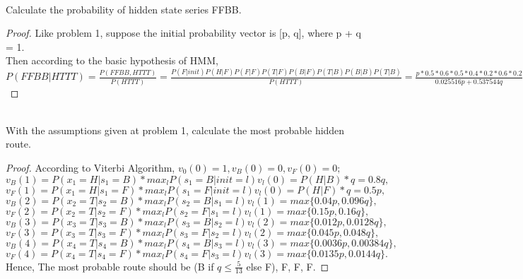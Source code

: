 \documentclass{article}
\newenvironment{problem}[2][Problem]{\begin{trivlist}
\item[\hskip \labelsep {\bfseries #1}\hskip \labelsep {\bfseries #2.}]}{\end{trivlist}}
\begin{document}
\begin{problem}{3}
\text{ } \\
Calculate the probability of hidden state series FFBB.
\end{problem}
\begin{proof}
Like problem 1, suppose the initial probability vector is [p, q], where p + q = 1. \\
Then according to the basic hypothesis of HMM, \\
$P(FFBB|HTTT) = \frac{P(FFBB,HTTT)}{P(HTTT)} = \frac{P(F|init)P(H|F)P(F|F)P(T|F)P(B|F)P(T|B)P(B|B)P(T|B)}{P(HTTT)} = \frac{p*0.5*0.6*0.5*0.4*0.2*0.6*0.2}{0.025516p + 0.537544q} = \frac{0.00144p}{0.025516p+0.537544q}.$
\end{proof}

\begin{problem}{4}
\text{ }\\
With the assumptions given at problem 1, calculate the most probable hidden route.
\end{problem}
\begin{proof}
According to Viterbi Algorithm, $v_{0}(0)=1, v_{B}(0)=0, v_{F}(0)=0;$ \\
$v_{B}(1)=P(x_{1}=H|s_{1}=B)*max_{l}P(s_1=B|init=l)v_{l}(0)=P(H|B)*q=0.8q,$ \\
$v_{F}(1)=P(x_{1}=H|s_{1}=F)*max_{l}P(s_1=F|init=l)v_{l}(0)=P(H|F)*q=0.5p,$ \\
$v_{B}(2)=P(x_{2}=T|s_{2}=B)*max_{l}P(s_2=B|s_{1}=l)v_{l}(1)=max\{0.04p, 0.096q\},$ \\
$v_{F}(2)=P(x_{2}=T|s_{2}=F)*max_{l}P(s_2=F|s_{1}=l)v_{l}(1)=max\{0.15p, 0.16q\},$ \\
$v_{B}(3)=P(x_{3}=T|s_{3}=B)*max_{l}P(s_3=B|s_{2}=l)v_{l}(2)=max\{0.012p, 0.0128q\},$ \\
$v_{F}(3)=P(x_{3}=T|s_{3}=F)*max_{l}P(s_3=F|s_{2}=l)v_{l}(2)=max\{0.045p, 0.048q\},$ \\
$v_{B}(4)=P(x_{4}=T|s_{4}=B)*max_{l}P(s_4=B|s_{3}=l)v_{l}(3)=max\{0.0036p, 0.00384q\},$ \\
$v_{F}(4)=P(x_{4}=T|s_{4}=F)*max_{l}P(s_4=F|s_{3}=l)v_{l}(3)=max\{0.0135p, 0.0144q\}. $\\
Hence, The most probable route should be (B if $q\leqslant\frac{5}{13}$ else F), F, F, F.
\end{proof}
\end{document}
